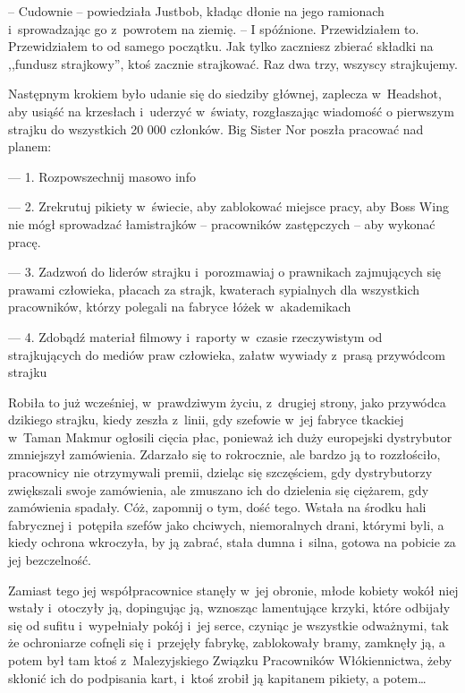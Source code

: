 \documentclass[oneside,polish,11pt,rmheadings]{mwbk}
\begin{document}
-- Cudownie -- powiedziała Justbob, kładąc dłonie na jego ramionach i~sprowadzając go z~powrotem na ziemię. -- I spóźnione. Przewidziałem to. Przewidziałem to od samego początku. Jak tylko zaczniesz zbierać składki na ,,fundusz strajkowy'', ktoś zacznie strajkować. Raz dwa trzy, wszyscy strajkujemy.


Następnym krokiem było udanie się do siedziby głównej, zaplecza w~Headshot, aby usiąść na krzesłach i~uderzyć w~światy, rozgłaszając wiadomość o pierwszym strajku do wszystkich 20 000 członków. Big Sister Nor poszła pracować nad planem: 


--- 1. Rozpowszechnij masowo info


--- 2. Zrekrutuj pikiety w~świecie, aby zablokować miejsce pracy, aby Boss Wing nie mógł sprowadzać łamistrajków -- pracowników zastępczych -- aby wykonać pracę. 


--- 3. Zadzwoń do liderów strajku i~porozmawiaj o prawnikach zajmujących się prawami człowieka, płacach za strajk, kwaterach sypialnych dla wszystkich pracowników, którzy polegali na fabryce łóżek w~akademikach 


--- 4. Zdobądź materiał filmowy i~raporty w~czasie rzeczywistym od strajkujących do mediów praw człowieka, załatw wywiady z~prasą przywódcom strajku  


Robiła to już wcześniej, w~prawdziwym życiu, z~drugiej strony, jako przywódca dzikiego strajku, kiedy zeszła z~linii, gdy szefowie w~jej fabryce tkackiej w~Taman Makmur ogłosili cięcia płac, ponieważ ich duży europejski dystrybutor zmniejszył zamówienia. Zdarzało się to rokrocznie, ale bardzo ją to rozzłościło, pracownicy nie otrzymywali premii, dzieląc się szczęściem, gdy dystrybutorzy zwiększali swoje zamówienia, ale zmuszano ich do dzielenia się ciężarem, gdy zamówienia spadały. Cóż, zapomnij o tym, dość tego. Wstała na środku hali fabrycznej i~potępiła szefów jako chciwych, niemoralnych drani, którymi byli, a kiedy ochrona wkroczyła, by ją zabrać, stała dumna i~silna, gotowa na pobicie za jej bezczelność. 


Zamiast tego jej współpracownice stanęły w~jej obronie, młode kobiety wokół niej wstały i~otoczyły ją, dopingując ją, wznosząc lamentujące krzyki, które odbijały się od sufitu i~wypełniały pokój i~jej serce, czyniąc je wszystkie odważnymi, tak że ochroniarze cofnęli się i~przejęły fabrykę, zablokowały bramy, zamknęły ją, a potem był tam ktoś z~Malezyjskiego Związku Pracowników Włókiennictwa, żeby skłonić ich do podpisania kart, i~ktoś zrobił ją kapitanem pikiety, a potem\ldots  
\end{document}
